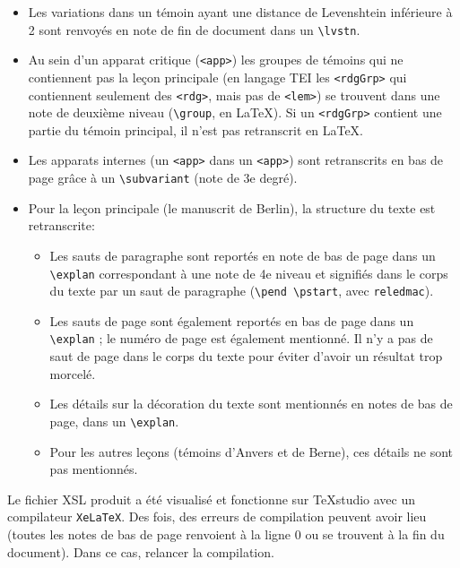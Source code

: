 \documentclass[12pt, a4paper]{article}
\begin{document}
\begin{itemize}
            \item{Les variations dans un témoin ayant une distance de Levenshtein inférieure
            à 2 sont renvoyés en note de fin de document dans un 
            \texttt{\textbackslash lvstn}}.
            \item{Au sein d'un apparat critique (\texttt{<app>}) les groupes de 
            témoins qui ne contiennent pas la leçon principale (en langage TEI 
            les \texttt{<rdgGrp>} qui contiennent seulement des 
            \texttt{<rdg>}, mais pas de \texttt{<lem>}) se trouvent 
            dans une note de deuxième niveau (\texttt{\textbackslash group}, en \LaTeX). Si un 
            \texttt{<rdgGrp>} contient une partie du témoin principal, il n'est 
            pas retranscrit en \LaTeX.}
            \item{Les apparats internes (un \texttt{<app>} dans un 
            \texttt{<app>}) sont retranscrits en bas de page grâce à un 
            \texttt{\textbackslash subvariant} (note de 3e degré).}
            \item{Pour la leçon principale (le manuscrit de Berlin), la structure du 
            texte est retranscrite:}
            \begin{itemize}
            \item{Les sauts de paragraphe sont reportés en note de 
            bas de page dans un \texttt{\textbackslash explan} correspondant à une note de 4e niveau 
            et signifiés dans le corps du texte par un saut de paragraphe 
            (\texttt{\textbackslash pend \textbackslash pstart}, avec \texttt{reledmac}).} 
            \item{Les sauts de page sont également reportés en bas de page dans un 
            \texttt{\textbackslash explan} ; le numéro de page est également mentionné. Il n'y a 
            pas de saut de page dans le corps du texte pour éviter d'avoir un résultat 
            trop morcelé.}
            \item{Les détails sur la décoration du texte sont mentionnés en notes de 
            bas de page, dans un \texttt{\textbackslash explan}.}
            \item{Pour les autres leçons (témoins d'Anvers et de Berne), ces 
            détails ne sont pas mentionnés.}
            \end{itemize}
            \end{itemize} 
            
            \indent Le fichier XSL produit a été visualisé et fonctionne sur TeXstudio 
            avec un compilateur \texttt{XeLaTeX}. Des fois, des erreurs de compilation 
            peuvent avoir lieu (toutes les notes de bas de page renvoient à la ligne 0 
            ou se trouvent à la fin du document). Dans ce cas, relancer la compilation.
        
\end{document}

